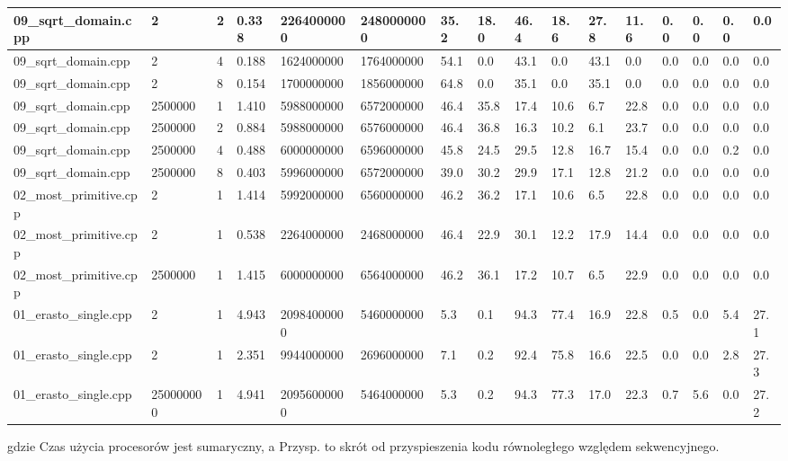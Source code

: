 \documentclass[12pt]{article}
\begin{document}
\begin{flushleft}
\begin{tabular}{| l | l | l | l | l | l | l | l | l | l | l | l | l | l | l | l |}
		09\_sqrt\_domain.cpp & 2 & 2 & 0.338 & 2264000000 & 2480000000 & 35.2 & 18.0 & 46.4 & 18.6 & 27.8 & 11.6 & 0.0 & 0.0 & 0.0 & 0.0 \\ \hline
		09\_sqrt\_domain.cpp & 2 & 4 & 0.188 & 1624000000 & 1764000000 & 54.1 & 0.0 & 43.1 & 0.0 & 43.1 & 0.0 & 0.0 & 0.0 & 0.0 & 0.0 \\ \hline
		09\_sqrt\_domain.cpp & 2 & 8 & 0.154 & 1700000000 & 1856000000 & 64.8 & 0.0 & 35.1 & 0.0 & 35.1 & 0.0 & 0.0 & 0.0 & 0.0 & 0.0 \\ \hline
		09\_sqrt\_domain.cpp & 2500000 & 1 & 1.410 & 5988000000 & 6572000000 & 46.4 & 35.8 & 17.4 & 10.6 & 6.7 & 22.8 & 0.0 & 0.0 & 0.0 & 0.0 \\ \hline
		09\_sqrt\_domain.cpp & 2500000 & 2 & 0.884 & 5988000000 & 6576000000 & 46.4 & 36.8 & 16.3 & 10.2 & 6.1 & 23.7 & 0.0 & 0.0 & 0.0 & 0.0 \\ \hline
		09\_sqrt\_domain.cpp & 2500000 & 4 & 0.488 & 6000000000 & 6596000000 & 45.8 & 24.5 & 29.5 & 12.8 & 16.7 & 15.4 & 0.0 & 0.0 & 0.2 & 0.0 \\ \hline
		09\_sqrt\_domain.cpp & 2500000 & 8 & 0.403 & 5996000000 & 6572000000 & 39.0 & 30.2 & 29.9 & 17.1 & 12.8 & 21.2 & 0.0 & 0.0 & 0.0 & 0.0 \\ \hline
		02\_most\_primitive.cpp & 2 & 1 & 1.414 & 5992000000 & 6560000000 & 46.2 & 36.2 & 17.1 & 10.6 & 6.5 & 22.8 & 0.0 & 0.0 & 0.0 & 0.0 \\ \hline
		02\_most\_primitive.cpp & 2 & 1 & 0.538 & 2264000000 & 2468000000 & 46.4 & 22.9 & 30.1 & 12.2 & 17.9 & 14.4 & 0.0 & 0.0 & 0.0 & 0.0 \\ \hline
		02\_most\_primitive.cpp & 2500000 & 1 & 1.415 & 6000000000 & 6564000000 & 46.2 & 36.1 & 17.2 & 10.7 & 6.5 & 22.9 & 0.0 & 0.0 & 0.0 & 0.0 \\ \hline
		01\_erasto\_single.cpp & 2 & 1 & 4.943 & 20984000000 & 5460000000 & 5.3 & 0.1 & 94.3 & 77.4 & 16.9 & 22.8 & 0.5 & 0.0 & 5.4 & 27.1 \\ \hline
		01\_erasto\_single.cpp & 2 & 1 & 2.351 & 9944000000 & 2696000000 & 7.1 & 0.2 & 92.4 & 75.8 & 16.6 & 22.5 & 0.0 & 0.0 & 2.8 & 27.3 \\ \hline
		01\_erasto\_single.cpp & 250000000 & 1 & 4.941 & 20956000000 & 5464000000 & 5.3 & 0.2 & 94.3 & 77.3 & 17.0 & 22.3 & 0.7 & 5.6 & 0.0 & 27.2 \\ \hline
	\end{tabular}
gdzie Czas użycia procesorów jest sumaryczny, a Przysp. to skrót od przyspieszenia kodu równoległego względem sekwencyjnego.
	
\end{flushleft}
\end{document}
